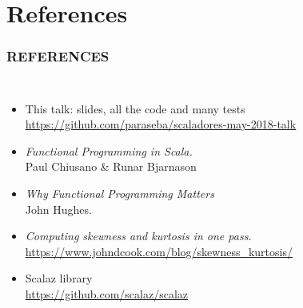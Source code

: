 \documentclass{beamer}
\begin{document}
\section*{References}
\begin{frame} \frametitle{REFERENCES}
  \begin{columns}[c]
      \begin{itemize}

        \item This talk: slides, all the \alert{code and many tests} \\
          \href{https://github.com/paraseba/scaladores-may-2018-talk}{\underline{https://github.com/paraseba/scaladores-may-2018-talk}} %

        \item \textit{Functional Programming in Scala.}\\ Paul Chiusano \& Runar Bjarnason

        \item \textit{Why Functional Programming Matters} \\
          John Hughes.

        \item \textit{Computing skewness and kurtosis in one pass.} \\
          {\footnotesize \href{https://www.johndcook.com/blog/skewness\_kurtosis/}{\underline{https://www.johndcook.com/blog/skewness\_kurtosis/}}}

        \item Scalaz library \\
          {\href{https://github.com/scalaz/scalaz}{\underline{https://github.com/scalaz/scalaz}}}
      \end{itemize}



\end{columns}
\end{frame}
\end{document}
